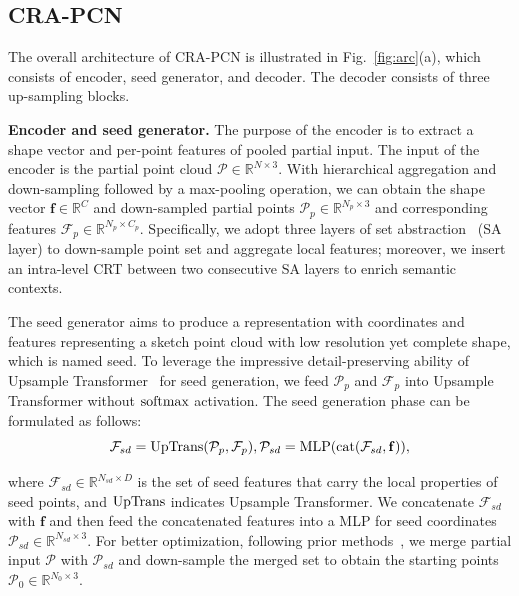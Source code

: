 \documentclass[letterpaper]{article} %
\newcommand{\ve}[1]{\mathbf{#1}} %
\begin{document}
\subsection{CRA-PCN}
The overall architecture of CRA-PCN is illustrated in Fig.~\ref{fig:arc}(a), which consists of encoder, seed generator, and decoder. 
The decoder consists of three up-sampling blocks.

{\bf Encoder and seed generator.} 
The purpose of the encoder is to extract a shape vector and per-point features of pooled partial input.
The input of the encoder is the partial point cloud $\mathcal{P} \in \mathbb{R}^{N \times 3}$.
With hierarchical aggregation and down-sampling followed by a max-pooling operation, we can obtain the shape vector $\ve{f} \in \mathbb{R}^{C}$ and down-sampled partial points  
$\mathcal{P}_p \in \mathbb{R}^{N_p \times 3}$ and corresponding features $\mathcal{F}_p \in \mathbb{R}^{N_p \times C_p}$.
Specifically, we adopt three layers of set abstraction~\cite{qi2017pointnet++} (SA layer) to down-sample point set and aggregate local features; moreover, we insert an intra-level CRT  between two consecutive SA layers to enrich semantic contexts. 

The seed generator aims to produce a representation with coordinates and features representing a sketch point cloud with low resolution yet complete shape, which is named seed.
To leverage the impressive detail-preserving ability of Upsample Transformer~\cite{zhou2022seedformer} for seed generation, we feed  $\mathcal{P}_p$ and $\mathcal{F}_p$  into Upsample Transformer without $\rm {softmax} $ activation. 
The seed generation phase can be formulated as follows:
\begin{equation}
{\mathcal F}_{sd} = {\mathrm {UpTrans}}({\mathcal P}_p, {\mathcal F}_p), {\mathcal P}_{sd} = {\rm MLP} ({\rm cat}({\mathcal F}_{sd}, {\ve f})),
\end{equation}

{\noindent}where ${\mathcal F}_{sd} \in \mathbb{R}^{N_{sd} \times D}$ is the set of seed features that carry the local properties of seed points, and $\rm UpTrans$ indicates Upsample Transformer. 
We concatenate ${\mathcal F}_{sd}$ with $\ve{f}$ and then feed the concatenated features into a MLP for seed coordinates ${\mathcal P}_{sd} \in \mathbb{R}^{N_{sd} \times 3}$. 
For better optimization, following prior methods~\cite{xiang2021snowflakenet, wang2020cascaded}, we merge partial input $\mathcal{P}$ with ${\mathcal P}_{sd} $ and down-sample the merged set to obtain the starting points ${\mathcal P}_0\in \mathbb{R}^{N_0\times 3}$.
\end{document}
